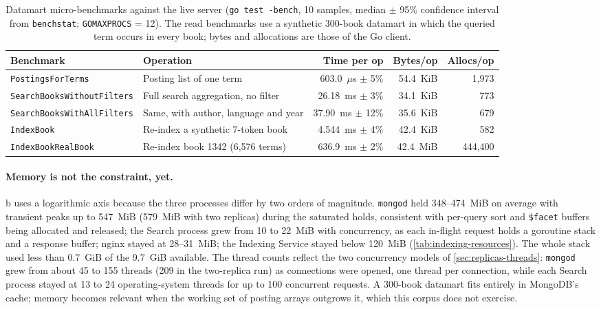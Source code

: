 \documentclass[10pt,a4paper]{article}
\newcommand{\code}[1]{\texttt{#1}}
\begin{document}
\begin{table}[htbp]
  \centering
  \footnotesize
  \caption{Datamart micro-benchmarks against the live server
  (\code{go test -bench}, 10 samples, median $\pm$ 95\% confidence interval from
  \code{benchstat}; \code{GOMAXPROCS} = 12). The read benchmarks use a synthetic
  300-book datamart in which the queried term occurs in every book; bytes and
  allocations are those of the Go client.}
  \label{tab:datamart-micro}
  \begin{tabularx}{\textwidth}{@{}l>{\raggedright\arraybackslash}Xrrr@{}}
    \toprule
    Benchmark & Operation & Time per op & Bytes/op & Allocs/op \\
    \midrule
    \code{PostingsForTerms} & Posting list of one term & 603.0~$\mu$s $\pm$ 5\% & 54.4~KiB & 1{,}973 \\
    \code{SearchBooksWithoutFilters} & Full search aggregation, no filter & 26.18~ms $\pm$ 3\% & 34.1~KiB & 773 \\
    \code{SearchBooksWithAllFilters} & Same, with author, language and year & 37.90~ms $\pm$ 12\% & 35.6~KiB & 679 \\
    \code{IndexBook} & Re-index a synthetic 7-token book & 4.544~ms $\pm$ 4\% & 42.4~KiB & 582 \\
    \code{IndexBookRealBook} & Re-index book 1342 (6{,}576 terms) & 636.9~ms $\pm$ 2\% & 42.4~MiB & 444{,}400 \\
    \bottomrule
  \end{tabularx}
\end{table}

\paragraph{Memory is not the constraint, yet.}
b uses a logarithmic axis because the three processes differ by
two orders of magnitude. \code{mongod} held 348--474~MiB on average with
transient peaks up to 547~MiB (579~MiB with two replicas) during the saturated
holds, consistent with per-query sort and \code{\$facet} buffers being
allocated and released; the Search process grew from 10 to 22~MiB with
concurrency, as each in-flight request holds a goroutine stack and a response
buffer; nginx stayed at 28--31~MiB; the Indexing Service stayed below 120~MiB
(\cref{tab:indexing-resources}). The whole stack used less than 0.7~GiB of the
9.7~GiB available. The thread counts reflect the two concurrency models of
\cref{sec:replicas-threads}: \code{mongod} grew from about 45 to 155 threads (209
in the two-replica run) as connections were opened, one thread per connection,
while each Search process stayed at 13 to 24 operating-system threads for up to
100 concurrent requests. A 300-book datamart fits entirely in MongoDB's cache;
memory becomes relevant when the working set of posting arrays outgrows it,
which this corpus does not exercise.
\end{document}
